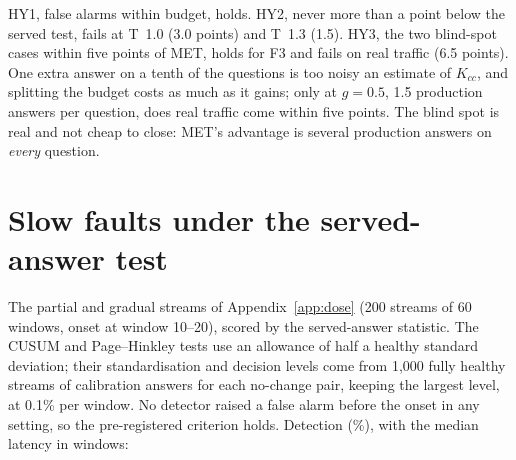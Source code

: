 \documentclass{article}
\begin{document}
\begin{center}\small
\setlength{\tabcolsep}{3pt}
\end{center}

\noindent HY1, false alarms within budget, holds. HY2, never more than a point below
the served test, fails at T~1.0 (3.0 points) and T~1.3 (1.5). HY3, the two
blind-spot cases within five points of MET, holds for F3 and fails on real traffic
(6.5 points). One extra answer on a tenth of the questions is too noisy an estimate
of $K_{cc}$, and splitting the budget costs as much as it gains; only at $g=0.5$,
1.5 production answers per question, does real traffic come within five points.
The blind spot is real and not cheap to close: MET's advantage is several
production answers on \emph{every} question.

\section{Slow faults under the served-answer test}
\label{app:slow}

The partial and gradual streams of Appendix~\ref{app:dose} (200 streams of 60
windows, onset at window 10--20), scored by the served-answer statistic. The
CUSUM and Page--Hinkley tests use an allowance of half a healthy standard deviation;
their standardisation and decision levels come from 1{,}000 fully healthy streams
of calibration answers for each no-change pair, keeping the largest level, at 0.1\%
per window. No detector raised a false alarm before the onset in any setting, so
the pre-registered criterion holds. Detection (\%), with the median latency in windows:
\end{document}
